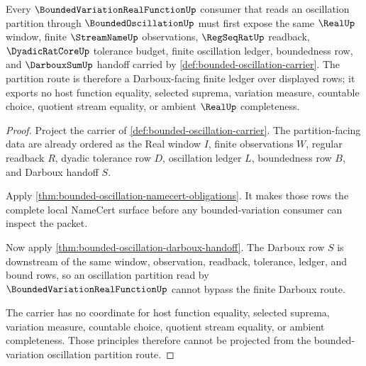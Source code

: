 \begin{theorem}
\label{thm:bounded-variation-oscillation-partition-route}
Every $\BoundedVariationRealFunctionUp$ consumer that reads an oscillation partition through $\BoundedOscillationUp$ must first expose the same $\RealUp$ window, finite $\StreamNameUp$ observations, $\RegSeqRatUp$ readback, $\DyadicRatCoreUp$ tolerance budget, finite oscillation ledger, boundedness row, and $\DarbouxSumUp$ handoff carried by \autoref{def:bounded-oscillation-carrier}. The partition route is therefore a Darboux-facing finite ledger over displayed rows; it exports no host function equality, selected suprema, variation measure, countable choice, quotient stream equality, or ambient $\RealUp$ completeness.
\end{theorem}
\begin{proof}
Project the carrier of \autoref{def:bounded-oscillation-carrier}. The partition-facing data are already ordered as the Real window $I$, finite observations $W$, regular readback $R$, dyadic tolerance row $D$, oscillation ledger $L$, boundedness row $B$, and Darboux handoff $S$.

Apply \autoref{thm:bounded-oscillation-namecert-obligations}. It makes those rows the complete local NameCert surface before any bounded-variation consumer can inspect the packet.

Now apply \autoref{thm:bounded-oscillation-darboux-handoff}. The Darboux row $S$ is downstream of the same window, observation, readback, tolerance, ledger, and bound rows, so an oscillation partition read by $\BoundedVariationRealFunctionUp$ cannot bypass the finite Darboux route.

The carrier has no coordinate for host function equality, selected suprema, variation measure, countable choice, quotient stream equality, or ambient completeness. Those principles therefore cannot be projected from the bounded-variation oscillation partition route.
\end{proof}


